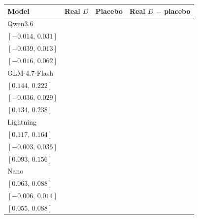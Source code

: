 \begingroup
\fontsize{10}{11.5}\selectfont
\setlength{\tabcolsep}{3pt}
\renewcommand{\arraystretch}{1.08}
\begin{tabular*}{\linewidth}{@{\extracolsep{\fill}}lccc@{}}
\toprule
Model & Real $D$ & Placebo & Real $D$ $-$ placebo \\
\midrule
Qwen3.6 & \begin{tabular}[t]{@{}c@{}}\(0.008\)\\\([-0.014,\,0.031]\)\end{tabular} & \begin{tabular}[t]{@{}c@{}}\(-0.013\)\\\([-0.039,\,0.013]\)\end{tabular} & \begin{tabular}[t]{@{}c@{}}\(0.021\)\\\([-0.016,\,0.062]\)\end{tabular}\\[2pt]
GLM-4.7-Flash & \begin{tabular}[t]{@{}c@{}}\(0.183\)\\\([0.144,\,0.222]\)\end{tabular} & \begin{tabular}[t]{@{}c@{}}\(-0.004\)\\\([-0.036,\,0.029]\)\end{tabular} & \begin{tabular}[t]{@{}c@{}}\(0.186\)\\\([0.134,\,0.238]\)\end{tabular}\\[2pt]
Lightning & \begin{tabular}[t]{@{}c@{}}\(0.140\)\\\([0.117,\,0.164]\)\end{tabular} & \begin{tabular}[t]{@{}c@{}}\(0.016\)\\\([-0.003,\,0.035]\)\end{tabular} & \begin{tabular}[t]{@{}c@{}}\(0.124\)\\\([0.093,\,0.156]\)\end{tabular}\\[2pt]
Nano & \begin{tabular}[t]{@{}c@{}}\(0.075\)\\\([0.063,\,0.088]\)\end{tabular} & \begin{tabular}[t]{@{}c@{}}\(0.004\)\\\([-0.006,\,0.014]\)\end{tabular} & \begin{tabular}[t]{@{}c@{}}\(0.072\)\\\([0.055,\,0.088]\)\end{tabular}\\[2pt]

\end{tabular*}
